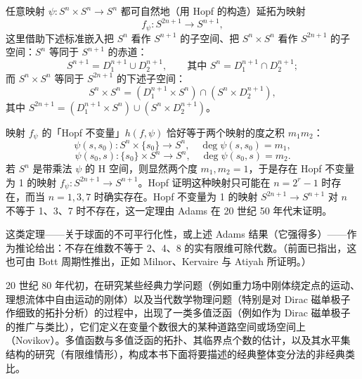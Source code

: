 任意映射 $\psi:S^n\times S^n\to S^n$ 都可自然地（用 Hopf 的构造）延拓为映射
\[
  f_\psi:S^{2n+1}\to S^{n+1},
\]
这里借助下述标准嵌入把 $S^n$ 看作 $S^{n+1}$ 的子空间、把 $S^n\times S^n$ 看作 $S^{2n+1}$ 的子空间：$S^n$ 等同于 $S^{n+1}$ 的赤道：
\[
  S^{n+1}=D_1^{n+1}\cup D_2^{n+1},\qquad\text{其中 }S^n=D_1^{n+1}\cap D_2^{n+1};
\]
而 $S^n\times S^n$ 等同于 $S^{2n+1}$ 的下述子空间：
\[
  S^n\times S^n=(D_1^{n+1}\times S^n)\cap(S^n\times D_2^{n+1}),
\]
其中 $S^{2n+1}=(D_1^{n+1}\times S^n)\cup(S^n\times D_2^{n+1})$。

映射 $f_\psi$ 的「Hopf 不变量」$h(f,\psi)$ 恰好等于两个映射的度之积 $m_1m_2$：
\[
  \psi(s,s_0):S^n\times\{s_0\}\to S^n,\quad \deg\psi(s,s_0)=m_1,
\]
\[
  \psi(s_0,s):\{s_0\}\times S^n\to S^n,\quad \deg\psi(s_0,s)=m_2.
\]
若 $S^n$ 是带乘法 $\psi$ 的 H 空间，则显然两个度 $m_1,m_2=1$，于是存在 Hopf 不变量为 1 的映射 $f_\psi:S^{2n+1}\to S^{n+1}$。Hopf 证明这种映射只可能在 $n=2^r-1$ 时存在，而当 $n=1,3,7$ 时确实存在。Hopf 不变量为 1 的映射 $S^{2n+1}\to S^{n+1}$ 对 $n$ 不等于 1、3、7 时不存在，这一定理由 Adams 在 20 世纪 50 年代末证明。

这类定理——关于球面的不可平行化性，或上述 Adams 结果（它强得多）——作为推论给出：不存在维数不等于 2、4、8 的实有限维可除代数。（前面已指出，这也可由 Bott 周期性推出，正如 Milnor、Kervaire 与 Atiyah 所证明。）

20 世纪 80 年代初，在研究某些经典力学问题（例如重力场中刚体绕定点的运动、理想流体中自由运动的刚体）以及当代数学物理问题（特别是对 Dirac 磁单极子作细致的拓扑分析）的过程中，出现了一类多值泛函（例如作为 Dirac 磁单极子的推广与类比），它们定义在变量个数很大的某种道路空间或场空间上（Novikov）。多值函数与多值泛函的拓扑、其临界点个数的估计，以及其水平集结构的研究（有限维情形），构成本书下面将要描述的经典整体变分法的非经典类比。

